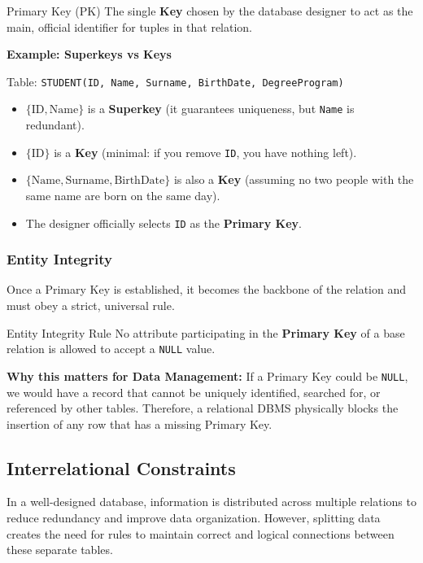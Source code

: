 \begin{defbox}{Primary Key (PK)}
The single \textbf{Key} chosen by the database designer to act as the main, official identifier for tuples in that relation. 
\end{defbox}

\vspace{0.2cm}
\begin{example}{\textbf{Example: Superkeys vs Keys}}

Table: \texttt{STUDENT(ID, Name, Surname, BirthDate, DegreeProgram)}

\begin{itemize}
    \item $\{\text{ID}, \text{Name}\}$ is a \textbf{Superkey} (it guarantees uniqueness, but \texttt{Name} is redundant).
    \item $\{\text{ID}\}$ is a \textbf{Key} (minimal: if you remove \texttt{ID}, you have nothing left).
    \item $\{\text{Name}, \text{Surname}, \text{BirthDate}\}$ is also a \textbf{Key} (assuming no two people with the same name are born on the same day).
    \item The designer officially selects \texttt{ID} as the \textbf{Primary Key}.
\end{itemize}
\end{example}

\subsubsection{Entity Integrity}
Once a Primary Key is established, it becomes the backbone of the relation and must obey a strict, universal rule.

\begin{defbox}{Entity Integrity Rule}
No attribute participating in the \textbf{Primary Key} of a base relation is allowed to accept a \texttt{NULL} value.
\end{defbox}

\textbf{Why this matters for Data Management:}
If a Primary Key could be \texttt{NULL}, we would have a record that cannot be uniquely identified, searched for, or referenced by other tables. Therefore, a relational DBMS physically blocks the insertion of any row that has a missing Primary Key.

\subsection{Interrelational Constraints}
In a well-designed database, information is distributed across multiple relations to reduce redundancy and improve data organization. However, splitting data creates the need for rules to maintain correct and logical connections between these separate tables.

